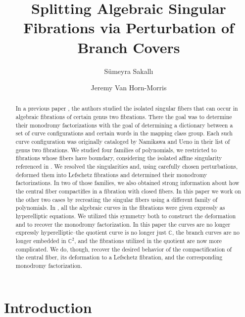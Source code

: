 \documentclass[11pt,letterpaper,reqno]{amsart}
\title{Splitting Algebraic Singular Fibrations via Perturbation of Branch Covers
}
\author[S.\ Sakall{\i}]{S\"umeyra Sakall{\i}}
\author[Jeremy Van Horn-Morris]{Jeremy Van Horn-Morris}\email{jv002@uark.edu}\urladdr{https://jv002.hosted.uark.edu}
\theoremstyle{remark}
\newcommand{\CC}{{\mathbb C}}
\begin{document}
\begin{abstract} 
In a previous paper \cite{SV}, the authors studied the isolated singular fibers that can occur in algebraic fibrations of certain genus two fibrations. There the goal was to determine their monodromy factorizations with the goal of determining a dictionary between a set of curve configurations and certain words in the mapping class group. Each such curve configuration was originally cataloged by Namikawa and Ueno \cite{NamikawaUeno-list} in their list of genus two fibrations. We studied four families of polynomials, we restricted to fibrations whose fibers have boundary, considering the isolated affine singularity referenced in \cite{NamikawaUeno-list}. We resolved the singularities and, using carefully chosen perturbations, deformed them into Lefschetz fibrations and determined their monodromy factorizations. In two of those families, we also obtained strong information about how the central fiber compactifies in a fibration with closed fibers. In this paper we work on the other two cases by recreating the singular fibers using a different family of polynomials. In \cite{SV}, all the algebraic curves in the fibrations were given expressly as hyperelliptic equations. We utilized this symmetry both to construct the deformation and to recover the monodromy factorization. In this paper the curves are no longer expressly hyperelliptic--the quotient curve is no longer just $\CC$, the branch curves are no longer embedded in $\CC^2$, and the fibrations utilized in the quotient are now more complicated. We do, though, recover the desired behavior of the compactification of the central fiber, its deformation to a Lefschetz fibration, and the corresponding monodromy factorization. 




\end{abstract}





\maketitle
\section{Introduction}
\end{document}
